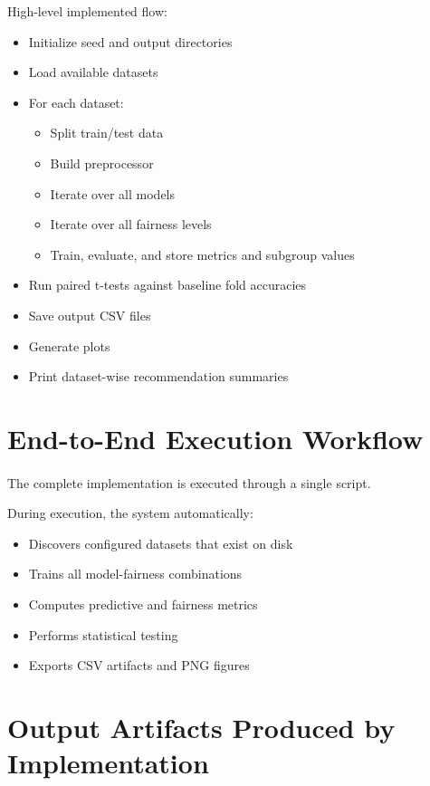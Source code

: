 High-level implemented flow:
\begin{itemize}
    \item Initialize seed and output directories
    \item Load available datasets
    \item For each dataset:
    \begin{itemize}
        \item Split train/test data
        \item Build preprocessor
        \item Iterate over all models
        \item Iterate over all fairness levels
        \item Train, evaluate, and store metrics and subgroup values
    \end{itemize}
    \item Run paired t-tests against baseline fold accuracies
    \item Save output CSV files
    \item Generate plots
    \item Print dataset-wise recommendation summaries
\end{itemize}

\section{End-to-End Execution Workflow}
\paragraph{}

The complete implementation is executed through a single script.

During execution, the system automatically:
\begin{itemize}
    \item Discovers configured datasets that exist on disk
    \item Trains all model-fairness combinations
    \item Computes predictive and fairness metrics
    \item Performs statistical testing
    \item Exports CSV artifacts and PNG figures
\end{itemize}

\section{Output Artifacts Produced by Implementation}
